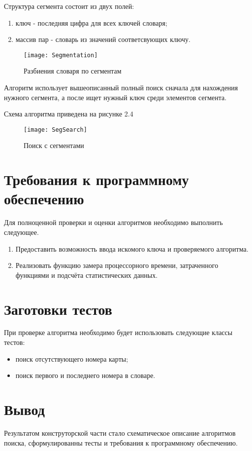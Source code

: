 Структура сегмента состоит из двух полей:
\begin{enumerate}
	\item ключ - последняя цифра для всех ключей словаря;
	\item массив пар - словарь из значений соответсвующих ключу.
\end{enumerate}

\begin{figure}[h]
	\begin{center}
		{\texttt{[image: Segmentation]}}
		\caption{Разбиения словаря по сегментам}
	\end{center}
\end{figure}

Алгоритм использует вышеописанный полный поиск сначала для нахождения нужного сегмента, а после ищет нужный ключ среди элементов сегмента.

Схема алгоритма приведена на рисунке 2.4
\begin{figure}[h]
	\begin{center}
		{\texttt{[image: SegSearch]}}
		\caption{Поиск с сегментами}
	\end{center}
\end{figure}


\section{Требования к программному обеспечению}
Для полноценной проверки и оценки алгоритмов необходимо выполнить следующее.
\begin{enumerate}
	\item Предоставить возможность ввода искомого ключа и проверяемого алгоритма.
	\item Реализовать функцию замера процессорного времени, затраченного функциями и подсчёта статистических данных.
\end{enumerate}


\section{Заготовки тестов}
При проверке алгоритма необходимо будет использовать следующие классы тестов:
\begin{itemize}
	\item поиск отсутствующего номера карты;
	\item поиск первого и последнего номера в словаре.
\end{itemize}

\section*{Вывод}
Результатом конструторской части стало схематическое описание алгоритмов поиска, сформулированны тесты и требования к программному обеспечению.


